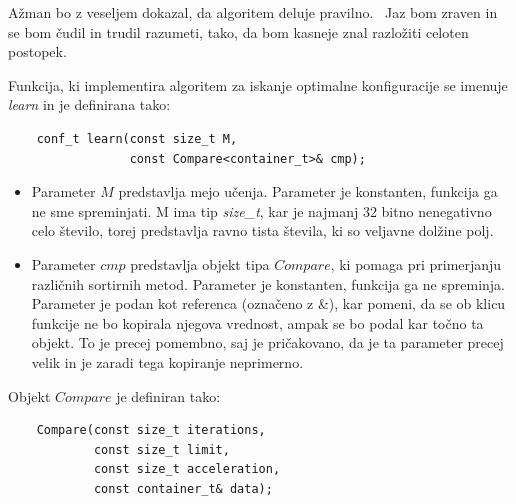 \documentclass[a4paper,oneside]{article}
\begin{document}
Ažman bo z veseljem dokazal, da algoritem deluje pravilno. \smiley\  
Jaz bom zraven in se bom čudil in trudil razumeti, tako, da bom kasneje znal razložiti
celoten postopek. \blacksmiley

Funkcija, ki implementira algoritem za iskanje optimalne konfiguracije 
se imenuje \emph{learn} in je definirana tako:


\begin{lstlisting}
    conf_t learn(const size_t M, 
                 const Compare<container_t>& cmp);
\end{lstlisting}

\begin{itemize}
  \item Parameter $M$ predstavlja mejo učenja. Parameter je
    konstanten, funkcija ga ne sme spreminjati. M ima tip \emph{size\_t}, kar je najmanj 32
    bitno nenegativno celo število, torej predstavlja ravno tista števila, ki so veljavne
    dolžine polj.
  \item Parameter $cmp$ predstavlja objekt tipa $Compare$, ki pomaga pri primerjanju
    različnih sortirnih metod. Parameter je konstanten, funkcija ga ne spreminja.
    Parameter je podan kot referenca (označeno z \&), kar pomeni, da se ob klicu funkcije
    ne bo kopirala njegova vrednost, ampak se bo podal kar točno ta objekt. To je precej
    pomembno, saj je pričakovano, da je ta parameter precej velik in je zaradi tega
    kopiranje neprimerno. 
\end{itemize}

Objekt $Compare$ je definiran tako:
\begin{lstlisting}
    Compare(const size_t iterations, 
            const size_t limit, 
            const size_t acceleration, 
            const container_t& data);
\end{lstlisting}
\end{document}
